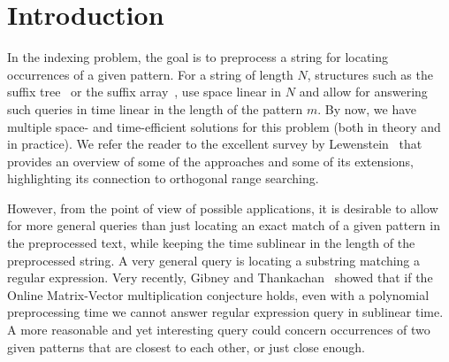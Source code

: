 \section{Introduction}
In the indexing problem, the goal is to preprocess a string for locating occurrences of a given pattern.
For a string of length $N$, structures such as the suffix tree~\cite{Weiner73} or the suffix array~\cite{ManberM93},
use space linear in $N$ and allow for answering such queries in time linear in the length of the pattern $m$. By now,
we have multiple space- and time-efficient solutions for this problem (both in theory and in practice).
We refer the reader to the excellent survey by Lewenstein~\cite{Lewenstein13} that provides an overview
of some of the approaches and some of its extensions, highlighting its connection to orthogonal range searching.

However, from the point of view of possible applications, it is desirable to allow for more general queries
than just locating an exact match of a given pattern in the preprocessed text, while keeping the time sublinear
in the length of the preprocessed string. A very general query is locating a substring matching a regular
expression.
%
Very recently, Gibney and Thankachan~\cite{GibneyT21} showed that if the Online Matrix-Vector multiplication conjecture holds, 
even with a polynomial preprocessing time we cannot answer regular expression query in sublinear time.
A more reasonable and yet interesting query could concern occurrences of two given patterns that are closest to each other, or just close enough.

